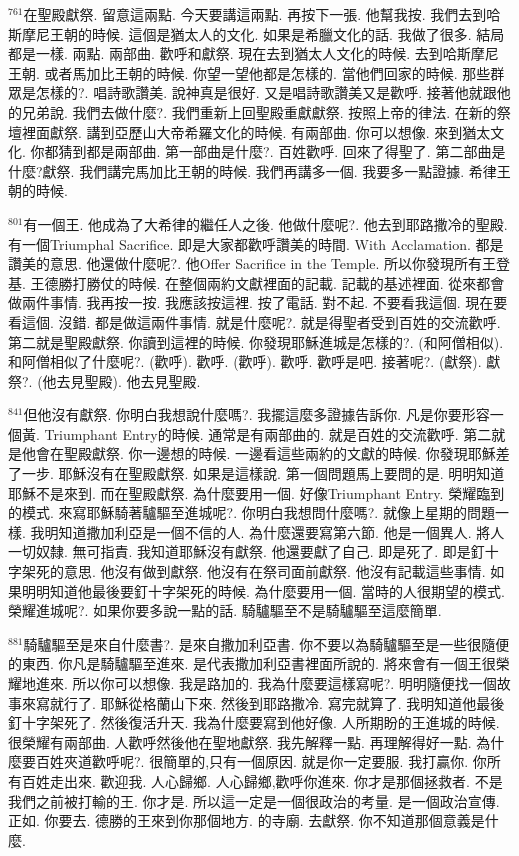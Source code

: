 \documentclass{book}
\begin{document}
$^{761}$在聖殿獻祭.
留意這兩點.
今天要講這兩點.
再按下一張.
他幫我按.
我們去到哈斯摩尼王朝的時候.
這個是猶太人的文化.
如果是希臘文化的話.
我做了很多.
結局都是一樣.
兩點.
兩部曲.
歡呼和獻祭.
現在去到猶太人文化的時候.
去到哈斯摩尼王朝.
或者馬加比王朝的時候.
你望一望他都是怎樣的.
當他們回家的時候.
那些群眾是怎樣的?.
唱詩歌讚美.
說神真是很好.
又是唱詩歌讚美又是歡呼.
接著他就跟他的兄弟說.
我們去做什麼?.
我們重新上回聖殿重獻獻祭.
按照上帝的律法.
在新的祭壇裡面獻祭.
講到亞歷山大帝希羅文化的時候.
有兩部曲.
你可以想像.
來到猶太文化.
你都猜到都是兩部曲.
第一部曲是什麼?.
百姓歡呼.
回來了得聖了.
第二部曲是什麼?獻祭.
我們講完馬加比王朝的時候.
我們再講多一個.
我要多一點證據.
希律王朝的時候.

$^{801}$有一個王.
他成為了大希律的繼任人之後.
他做什麼呢?.
他去到耶路撒冷的聖殿.
有一個Triumphal Sacrifice.
即是大家都歡呼讚美的時間.
With Acclamation.
都是讚美的意思.
他還做什麼呢?.
他Offer Sacrifice in the Temple.
所以你發現所有王登基.
王德勝打勝仗的時候.
在整個兩約文獻裡面的記載.
記載的基述裡面.
從來都會做兩件事情.
我再按一按.
我應該按這裡.
按了電話.
對不起.
不要看我這個.
現在要看這個.
沒錯.
都是做這兩件事情.
就是什麼呢?.
就是得聖者受到百姓的交流歡呼.
第二就是聖殿獻祭.
你讀到這裡的時候.
你發現耶穌進城是怎樣的?.
(和阿僧相似).
和阿僧相似了什麼呢?.
(歡呼).
歡呼.
(歡呼).
歡呼.
歡呼是吧.
接著呢?.
(獻祭).
獻祭?.
(他去見聖殿).
他去見聖殿.

$^{841}$但他沒有獻祭.
你明白我想說什麼嗎?.
我擺這麼多證據告訴你.
凡是你要形容一個黃.
Triumphant Entry的時候.
通常是有兩部曲的.
就是百姓的交流歡呼.
第二就是他會在聖殿獻祭.
你一邊想的時候.
一邊看這些兩約的文獻的時候.
你發現耶穌差了一步.
耶穌沒有在聖殿獻祭.
如果是這樣說.
第一個問題馬上要問的是.
明明知道耶穌不是來到.
而在聖殿獻祭.
為什麼要用一個.
好像Triumphant Entry.
榮耀臨到的模式.
來寫耶穌騎著驢驅至進城呢?.
你明白我想問什麼嗎?.
就像上星期的問題一樣.
我明知道撒加利亞是一個不信的人.
為什麼還要寫第六節.
他是一個異人.
將人一切奴隸.
無可指責.
我知道耶穌沒有獻祭.
他還要獻了自己.
即是死了.
即是釘十字架死的意思.
他沒有做到獻祭.
他沒有在祭司面前獻祭.
他沒有記載這些事情.
如果明明知道他最後要釘十字架死的時候.
為什麼要用一個.
當時的人很期望的模式.
榮耀進城呢?.
如果你要多說一點的話.
騎驢驅至不是騎驢驅至這麼簡單.

$^{881}$騎驢驅至是來自什麼書?.
是來自撒加利亞書.
你不要以為騎驢驅至是一些很隨便的東西.
你凡是騎驢驅至進來.
是代表撒加利亞書裡面所說的.
將來會有一個王很榮耀地進來.
所以你可以想像.
我是路加的.
我為什麼要這樣寫呢?.
明明隨便找一個故事來寫就行了.
耶穌從格蘭山下來.
然後到耶路撒冷.
寫完就算了.
我明知道他最後釘十字架死了.
然後復活升天.
我為什麼要寫到他好像.
人所期盼的王進城的時候.
很榮耀有兩部曲.
人歡呼然後他在聖地獻祭.
我先解釋一點.
再理解得好一點.
為什麼要百姓夾道歡呼呢?.
很簡單的,只有一個原因.
就是你一定要服.
我打贏你.
你所有百姓走出來.
歡迎我.
人心歸鄉.
人心歸鄉,歡呼你進來.
你才是那個拯救者.
不是我們之前被打輸的王.
你才是.
所以這一定是一個很政治的考量.
是一個政治宣傳.
正如.
你要去.
德勝的王來到你那個地方.
的寺廟.
去獻祭.
你不知道那個意義是什麼.
\end{document}
